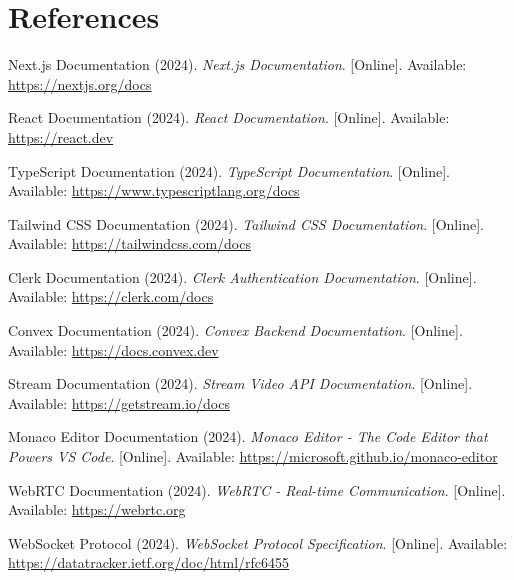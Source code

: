 \documentclass[12pt,a4paper]{report}
\begin{document}
\section{References}
\begin{thebibliography}{99}

 Next.js Documentation (2024). \textit{Next.js Documentation}. [Online]. Available: \url{https://nextjs.org/docs}

 React Documentation (2024). \textit{React Documentation}. [Online]. Available: \url{https://react.dev}

 TypeScript Documentation (2024). \textit{TypeScript Documentation}. [Online]. Available: \url{https://www.typescriptlang.org/docs}

 Tailwind CSS Documentation (2024). \textit{Tailwind CSS Documentation}. [Online]. Available: \url{https://tailwindcss.com/docs}

 Clerk Documentation (2024). \textit{Clerk Authentication Documentation}. [Online]. Available: \url{https://clerk.com/docs}

 Convex Documentation (2024). \textit{Convex Backend Documentation}. [Online]. Available: \url{https://docs.convex.dev}

 Stream Documentation (2024). \textit{Stream Video API Documentation}. [Online]. Available: \url{https://getstream.io/docs}



 Monaco Editor Documentation (2024). \textit{Monaco Editor - The Code Editor that Powers VS Code}. [Online]. Available: \url{https://microsoft.github.io/monaco-editor}

 WebRTC Documentation (2024). \textit{WebRTC - Real-time Communication}. [Online]. Available: \url{https://webrtc.org}

 WebSocket Protocol (2024). \textit{WebSocket Protocol Specification}. [Online]. Available: \url{https://datatracker.ietf.org/doc/html/rfc6455}




\end{thebibliography}
\end{document}

